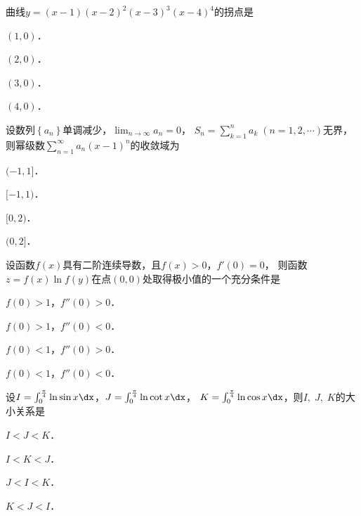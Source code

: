 \documentclass[plain,noanswer,medmath]{../../template/jnuexam}
\begin{document}




\begin{problem}
曲线$y = (x - 1)(x - 2)^2(x - 3)^3(x - 4)^4$的拐点是\pickout{}
\begin{abcd}
\item $(1,0)$．
\item $(2,0)$．
\item $(3,0)$．
\item $(4,0)$．
\end{abcd}
\end{problem}


\begin{problem}
设数列$\left\{a_n \right\}$单调减少，$\lim_{n \to \infty} a_n = 0$，
$S_n = \sum_{k = 1}^n a_k \;(n = 1,2, \cdots)$无界，
则幂级数$\sum_{n = 1}^{\infty}a_n (x - 1)^n$的收敛域为\pickout{}
\begin{abcd}
\item $(-1,1]$．
\item $[-1,1)$．
\item $[0,2)$．
\item $(0,2]$．
\end{abcd}
\end{problem}


\begin{problem}
设函数$f(x)$具有二阶连续导数，且$f(x) > 0$，$f'(0) = 0$，
则函数$z = f(x)\ln f(y)$在点$(0,0)$处取得极小值的一个充分条件是\pickout{}
\begin{abcd}
\item $f(0) > 1$，$f''(0) > 0$．
\item $f(0) > 1$，$f''(0) < 0$．
\item $f(0) < 1$，$f''(0) > 0$．
\item $f(0) < 1$，$f''(0) < 0$．
\end{abcd}
\end{problem}


\begin{problem}
设$I = \int_{0}^{\frac{\pi}{4}}\ln\sin x\dx$，$J = \int_{0}^{\frac{\pi}{4}}\ln\cot x\dx$，
$K = \int_{0}^{\frac{\pi}{4}}\ln\cos x\dx$，则$I,\;J,\;K$的大小关系是\pickout{}
\begin{abcd}
\item $I < J < K$．
\item $I < K < J$．
\item $J < I < K$．
\item $K < J < I$．
\end{abcd}
\end{problem}
\end{document}
